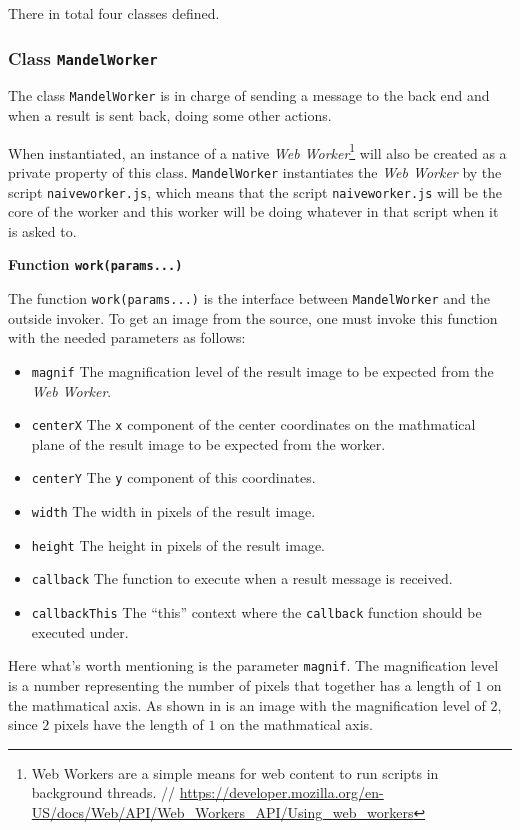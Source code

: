 There in total four classes defined.

\subsubsection{Class \texttt{MandelWorker}}

The class \texttt{MandelWorker} is in charge of sending a message to the back end and when a result is sent back, doing some other actions.

When instantiated, an instance of a native \emph{Web Worker}\footnote{ Web Workers are a simple means for web content to run scripts in background threads. // \url{https://developer.mozilla.org/en-US/docs/Web/API/Web_Workers_API/Using_web_workers}} will also be created as a private property of this class. \texttt{MandelWorker} instantiates the \emph{Web Worker} by the script \texttt{naive\-worker.js}, which means that the script \texttt{naive\-worker.js} will be the core of the worker and this worker will be doing whatever in that script when it is asked to.

\textbf{Function \texttt{work(params...)}}

The function \texttt{work(params...)} is the interface between \texttt{MandelWorker} and the outside invoker. To get an image from the source, one must invoke this function with the needed parameters as follows:

\begin{itemize}
    \item \texttt{magnif} The magnification level of the result image to be expected from the \emph{Web Worker}.
    \item \texttt{centerX} The \texttt{x} component of the center coordinates on the mathmatical plane of the result image to be expected from the worker.
    \item \texttt{centerY} The \texttt{y} component of this coordinates.
    \item \texttt{width} The width in pixels of the result image.
    \item \texttt{height} The height in pixels of the result image.
    \item \texttt{callback} The function to execute when a result message is received.
    \item \texttt{callbackThis} The ``this'' context where the \texttt{callback} function should be executed under.
\end{itemize}

Here what's worth mentioning is the parameter \texttt{magnif}. The magnification level is a number representing the number of pixels that together has a length of $1$ on the mathmatical axis. As shown in  is an image with the magnification level of $2$, since $2$ pixels have the length of $1$ on the mathmatical axis.

